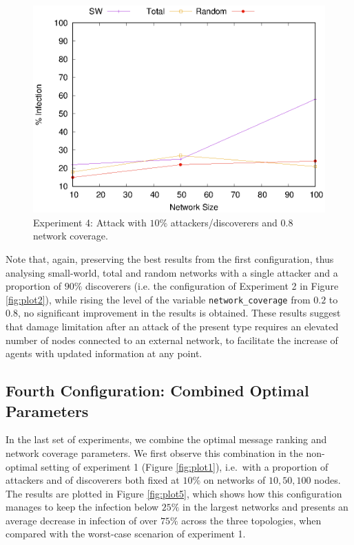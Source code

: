 \documentclass[compsoc, conference, letterpaper, 10pt, times]{IEEEtran}
\begin{document}
\begin{figure}
\includegraphics[scale=0.70]{4thconfig_10_90}
\caption{Experiment 4: Attack with $10\%$ attackers/discoverers and $0.8$ network coverage.}\label{fig:plot4}
\end{figure}
Note that, again, preserving the best results from the first configuration, thus analysing small-world, total and random networks with a single attacker and a proportion of $90\%$ discoverers (i.e. the configuration of Experiment 2 in Figure \ref{fig:plot2}), while rising the level of the variable \texttt{network\_coverage} from $0.2$ to $0.8$, no significant improvement in the results is obtained. These results suggest that damage limitation after an attack of the present type requires an elevated number of nodes connected to an external network, to facilitate the increase of agents with updated information at any point.

\subsection{Fourth Configuration: Combined Optimal Parameters}

In the last set of experiments, we combine the optimal message ranking and network coverage parameters. We first observe this combination in the non-optimal setting of experiment 1 (Figure \ref{fig:plot1}), i.e.\ with a proportion of attackers and of discoverers both fixed at $10\%$ on networks of $10,50,100$ nodes. The results are plotted in Figure \ref{fig:plot5}, which shows how this configuration manages to keep the infection below $25\%$ in the largest networks and presents an average decrease in infection of over $75\%$ across the three topologies, when compared with the worst-case scenarion of experiment 1.
\end{document}
